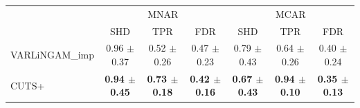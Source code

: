 \begin{tabular}{lcccccc}
\toprule
 & \multicolumn{3}{c}{MNAR} & \multicolumn{3}{c}{MCAR} \\
 & SHD & TPR & FDR & SHD & TPR & FDR \\
\midrule
VARLiNGAM\_imp & 0.96 $\pm$ 0.37 & 0.52 $\pm$ 0.26 & 0.47 $\pm$ 0.23 & 0.79 $\pm$ 0.43 & 0.64 $\pm$ 0.26 & 0.40 $\pm$ 0.24 \\
CUTS+ & \textbf{0.94 $\pm$ 0.45} & \textbf{0.73 $\pm$ 0.18} & \textbf{0.42 $\pm$ 0.16} & \textbf{0.67 $\pm$ 0.43} & \textbf{0.94 $\pm$ 0.10} & \textbf{0.35 $\pm$ 0.13} \\
\bottomrule
\end{tabular}

